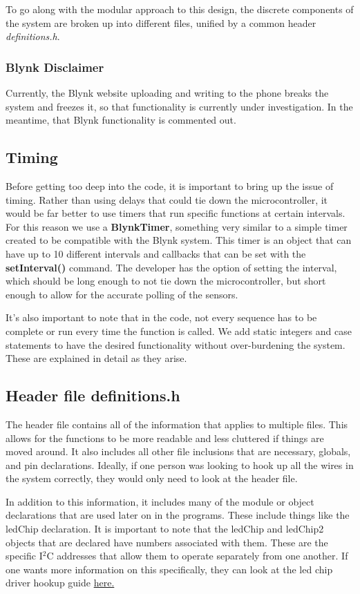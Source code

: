 \documentclass{article}
\begin{document}
To go along with the modular approach to this design, the discrete components of the system are broken up into different files, unified by a common header \textit{definitions.h}.

\subsubsection{Blynk Disclaimer}
 Currently, the Blynk website uploading and writing to the phone breaks the system and freezes it, so that functionality is currently under investigation. In the meantime, that Blynk functionality is commented out. 

\subsection{Timing}
Before getting too deep into the code, it is important to bring up the issue of timing. Rather than using delays that could tie down the microcontroller, it would be far better to use timers that run specific functions at certain intervals. For this reason we use a \textbf{BlynkTimer}, something very similar to a simple timer created to be compatible with the Blynk system. This timer is an object that can have up to 10 different intervals and callbacks that can be set with the \textbf{setInterval()} command. The developer has the option of setting the interval, which should be long enough to not tie down the microcontroller, but short enough to allow for the accurate polling of the sensors. 

It's also important to note that in the code, not every sequence has to be complete or run every time the function is called. We add static integers and case statements to have the desired functionality without over-burdening the system. These are explained in detail as they arise. 

\subsection{Header file definitions.h}
The header file contains all of the information that applies to multiple files. This allows for the functions to be more readable and less cluttered if things are moved around. It also includes all other file inclusions that are necessary, globals, and pin declarations. Ideally, if one person was looking to hook up all the wires in the system correctly, they would only need to look at the header file. 

In addition to this information, it includes many of the module or object declarations that are used later on in the programs. These include things like the ledChip declaration. It is important to note that the ledChip and ledChip2 objects that are declared have numbers associated with them. These are the specific I$^2$C addresses that allow them to operate separately from one another. If one wants more information on this specifically, they can look at the led chip driver hookup guide \href{https://learn.sparkfun.com/tutorials/lp55231-breakout-board-hookup-guide/all}{here.} 
\end{document}
